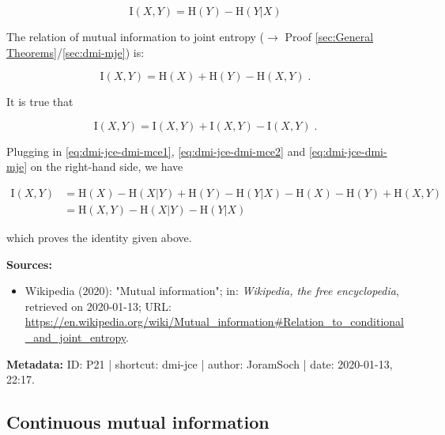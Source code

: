 \documentclass[a4paper,12pt,twoside]{book}
\begin{document}
\begin{equation} \label{eq:dmi-jce-dmi-mce2}
\mathrm{I}(X,Y) = \mathrm{H}(Y) - \mathrm{H}(Y|X)
\end{equation}

The relation of mutual information to joint entropy ($\rightarrow$ Proof \ref{sec:General Theorems}/\ref{sec:dmi-mje}) is:

\begin{equation} \label{eq:dmi-jce-dmi-mje}
\mathrm{I}(X,Y) = \mathrm{H}(X) + \mathrm{H}(Y) - \mathrm{H}(X,Y) \; .
\end{equation}

It is true that

\begin{equation} \label{eq:dmi-jce-MI-s1}
\mathrm{I}(X,Y) = \mathrm{I}(X,Y) + \mathrm{I}(X,Y) - \mathrm{I}(X,Y) \; .
\end{equation}

Plugging in \eqref{eq:dmi-jce-dmi-mce1}, \eqref{eq:dmi-jce-dmi-mce2} and \eqref{eq:dmi-jce-dmi-mje} on the right-hand side, we have

\begin{equation} \label{eq:dmi-jce-MI-s2}
\begin{split}
\mathrm{I}(X,Y) &= \mathrm{H}(X) - \mathrm{H}(X|Y) + \mathrm{H}(Y) - \mathrm{H}(Y|X) - \mathrm{H}(X) - \mathrm{H}(Y) + \mathrm{H}(X,Y) \\
&= \mathrm{H}(X,Y) - \mathrm{H}(X|Y) - \mathrm{H}(Y|X)
\end{split}
\end{equation}

which proves the identity given above.


\vspace{1em}
\textbf{Sources:}
\begin{itemize}
\item Wikipedia (2020): "Mutual information"; in: \textit{Wikipedia, the free encyclopedia}, retrieved on 2020-01-13; URL: \url{https://en.wikipedia.org/wiki/Mutual_information#Relation_to_conditional_and_joint_entropy}.
\end{itemize}


\vspace{1em}
\textbf{Metadata:} ID: P21 | shortcut: dmi-jce | author: JoramSoch | date: 2020-01-13, 22:17.
\vspace{1em}



\subsection{Continuous mutual information}
\end{document}
